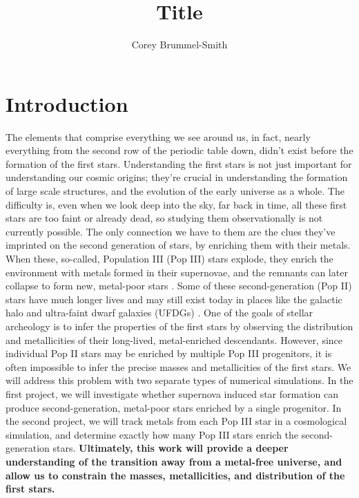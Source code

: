 \documentclass[a4paper, 12pt]{article}
\begin{document}
\fontsize{12}{16}\selectfont
\author{Corey Brummel-Smith}
\title{Title}



\section{Introduction}

The elements that comprise everything we see around us, in fact, nearly everything from the second row of the periodic table down, didn't exist before the formation of the first stars. Understanding the first stars is not just important for understanding our cosmic origins; they're crucial in understanding the formation of large scale structures, and the evolution of the early universe as a whole. The difficulty is, even when we look deep into the sky, far back in time, all these first stars are too faint or already dead, so studying them observationally is not currently possible. The only connection we have to them are the clues they've imprinted on the second generation of stars, by enriching them with their metals. When these, so-called, Population III (Pop III) stars explode, they enrich the environment with metals formed in their supernovae, and the remnants can later collapse to form new, metal-poor stars \cite{...}. Some of these second-generation (Pop II) stars have much longer lives and may still exist today in places like the galactic halo and ultra-faint dwarf galaxies (UFDGs) \citep{...}. One of the goals of stellar archeology is to infer the properties of the first stars by observing the distribution and metallicities of their long-lived, metal-enriched descendants. However, since individual Pop II stars may be enriched by multiple Pop III progenitors, it is often impossible to infer the precise masses and metallicities of the first stars. We will address this problem with two separate types of numerical simulations. In the first project, we will investigate whether supernova induced star formation can produce second-generation, metal-poor stars enriched by a single progenitor. In the second project, we will track metals from each Pop III star in a cosmological simulation, and determine exactly how many Pop III stars enrich the second-generation stars. \textbf{Ultimately, this work will provide a deeper understanding of the transition away from a metal-free universe, and allow us to constrain the masses, metallicities, and distribution of the first stars.}
\end{document}
